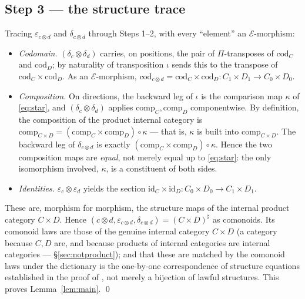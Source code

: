 \documentclass[11pt]{amsart}
\theoremstyle{plain}
\theoremstyle{definition}
\theoremstyle{remark}
\newcommand{\Ee}{\mathcal{E}}
\newcommand{\sharpc}[1]{#1^{\sharp}}   %
\newcommand{\id}{\mathrm{id}}
\newcommand{\cod}{\mathrm{cod}}
\newcommand{\comp}{\mathrm{comp}}
\begin{document}
\subsection*{Step 3 --- the structure trace}

Tracing $\varepsilon_{c\otimes d}$ and $\delta_{c\otimes d}$ through Steps 1--2, with every
``element'' an $\Ee$-morphism:

\begin{itemize}
\item \emph{Codomain.} $(\delta_c\otimes\delta_d)$ carries, on positions, the pair of
$\Pi$-transposes of $\cod_C$ and $\cod_D$; by naturality of transposition $\iota$ sends this to the
transpose of $\cod_C\times\cod_D$. As an $\Ee$-morphism,
$\cod_{c\otimes d}=\cod_C\times\cod_D:C_1\times D_1\to C_0\times D_0$.
\item \emph{Composition.} On directions, the backward leg of $\iota$ is the comparison map $\kappa$
of \eqref{eq:star}, and $(\delta_c\otimes\delta_d)$ applies $\comp_C,\comp_D$ componentwise. By
definition, the composition of the product internal category is
$\comp_{C\times D}=(\comp_C\times\comp_D)\circ\kappa$ --- that is, $\kappa$ is built into
$\comp_{C\times D}$. The backward leg of $\delta_{c\otimes d}$ is exactly
$(\comp_C\times\comp_D)\circ\kappa$. Hence the two composition maps are \emph{equal}, not merely equal
up to \eqref{eq:star}: the only isomorphism involved, $\kappa$, is a constituent of both sides.
\item \emph{Identities.} $\varepsilon_c\otimes\varepsilon_d$ yields the section
$\id_C\times\id_D:C_0\times D_0\to C_1\times D_1$.
\end{itemize}

These are, morphism for morphism, the structure maps of the internal product category $C\times D$.
Hence $(c\otimes d,\varepsilon_{c\otimes d},\delta_{c\otimes d})=\sharpc{(C\times D)}$ as comonoids.
Its comonoid laws are those of the genuine internal category $C\times D$ (a category because $C,D$
are, and because products of internal categories are internal categories --- \S\ref{sec:notproduct});
and that these are matched by the comonoid laws under the dictionary is the one-by-one correspondence
of structure equations established in the proof of \cite[Thm.~5.6]{ShapiroSpivak2023}, not merely a
bijection of lawful structures. This proves Lemma~\ref{lem:main}. \qed
\end{document}
